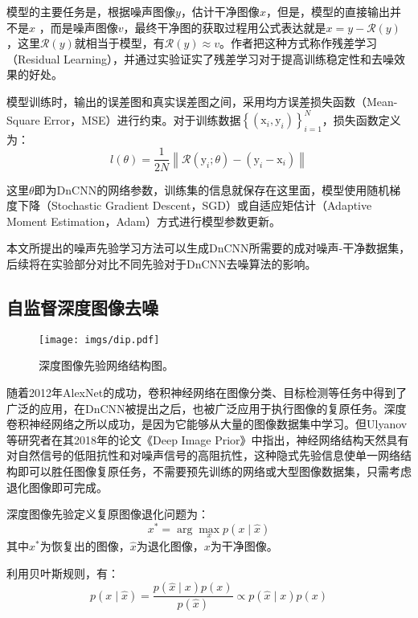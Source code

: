 模型的主要任务是，根据噪声图像$y$，估计干净图像$x$，但是，模型的直接输出并不是$x$ ，而是噪声图像$v$，最终干净图的获取过程用公式表达就是$x=y-\mathcal{R}(y)$，这里$\mathcal{R}(y)$就相当于模型，有$\mathcal{R}(y) \approx v$。作者把这种方式称作残差学习（Residual Learning），并通过实验证实了残差学习对于提高训练稳定性和去噪效果的好处。

模型训练时，输出的误差图和真实误差图之间，采用均方误差损失函数（Mean-Square Error，MSE）进行约束。对于训练数据$\left\{\left(\mathrm{x}_i, \mathrm{y}_i\right)\right\}_{i=1}^N$，损失函数定义为：
\begin{equation}
	l(\theta)=\frac{1}{2 N}\left\|\mathcal{R}\left(\mathrm{y}_i ; \theta\right)-\left(\mathrm{y}_i-\mathrm{x}_i\right)\right\|
	\label{dncnnloss}
\end{equation}

这里$\theta$即为DnCNN的网络参数，训练集的信息就保存在这里面，模型使用随机梯度下降（Stochastic Gradient Descent，SGD）或自适应矩估计（Adaptive Moment Estimation，Adam）方式进行模型参数更新。

本文所提出的噪声先验学习方法可以生成DnCNN所需要的成对噪声-干净数据集，后续将在实验部分对比不同先验对于DnCNN去噪算法的影响。

\subsection{自监督深度图像去噪}

\begin{figure}[h]
	\centering
	\texttt{[image: imgs/dip.pdf]}
	\caption{深度图像先验网络结构图。\cite{dip}}
	\label{fig:dip}
\end{figure}

随着2012年AlexNet\cite{alexnet}的成功，卷积神经网络在图像分类、目标检测等任务中得到了广泛的应用，在DnCNN\cite{dncnn}被提出之后，也被广泛应用于执行图像的复原任务。深度卷积神经网络之所以成功，是因为它能够从大量的图像数据集中学习。但Ulyanov等研究者在其2018年的论文《Deep Image Prior》\cite{dip}中指出，神经网络结构天然具有对自然信号的低阻抗性和对噪声信号的高阻抗性，这种隐式先验信息使单一网络结构即可以胜任图像复原任务，不需要预先训练的网络或大型图像数据集，只需考虑退化图像即可完成。

深度图像先验定义复原图像退化问题为：
\begin{equation}
	x^*=\arg \max _x p(x \mid \hat{x})
	\label{map}
\end{equation}
其中$x^*$为恢复出的图像，$\hat{x}$为退化图像，$x$为干净图像。

利用贝叶斯规则，有：
\begin{equation}
	p(x \mid \hat{x})=\frac{p(\hat{x} \mid x) p(x)}{p(\hat{x})} \propto p(\hat{x} \mid x) p(x)
\end{equation}

